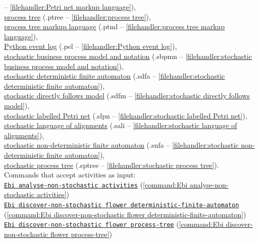 {-- \cref{filehandler:Petri net markup language}), \\\null\qquad\hyperref[filehandler:process tree]{process tree} (.ptree -- \cref{filehandler:process tree}), \\\null\qquad\hyperref[filehandler:process tree markup language]{process tree markup language} (.ptml -- \cref{filehandler:process tree markup language}), \\\null\qquad\hyperref[filehandler:Python event log]{Python event log} (.pel -- \cref{filehandler:Python event log}), \\\null\qquad\hyperref[filehandler:stochastic business process model and notation]{stochastic business process model and notation} (.sbpmn -- \cref{filehandler:stochastic business process model and notation}), \\\null\qquad\hyperref[filehandler:stochastic deterministic finite automaton]{stochastic deterministic finite automaton} (.sdfa -- \cref{filehandler:stochastic deterministic finite automaton}), \\\null\qquad\hyperref[filehandler:stochastic directly follows model]{stochastic directly follows model} (.sdfm -- \cref{filehandler:stochastic directly follows model}), \\\null\qquad\hyperref[filehandler:stochastic labelled Petri net]{stochastic labelled Petri net} (.slpn -- \cref{filehandler:stochastic labelled Petri net}), \\\null\qquad\hyperref[filehandler:stochastic language of alignments]{stochastic language of alignments} (.sali -- \cref{filehandler:stochastic language of alignments}), \\\null\qquad\hyperref[filehandler:stochastic non-deterministic finite automaton]{stochastic non-deterministic finite automaton} (.snfa -- \cref{filehandler:stochastic non-deterministic finite automaton}), \\\null\qquad\hyperref[filehandler:stochastic process tree]{stochastic process tree} (.sptree -- \cref{filehandler:stochastic process tree}).
\\Commands that accept  activities as input: \\\null\qquad\hyperref[command:Ebi analyse-non-stochastic activities]{\texttt{Ebi analyse-non-stochastic activities}} (\cref{command:Ebi analyse-non-stochastic activities})\\\null\qquad\hyperref[command:Ebi discover-non-stochastic flower deterministic-finite-automaton]{\texttt{Ebi discover-non-stochastic flower deterministic-finite-automaton}} (\cref{command:Ebi discover-non-stochastic flower deterministic-finite-automaton})\\\null\qquad\hyperref[command:Ebi discover-non-stochastic flower process-tree]{\texttt{Ebi discover-non-stochastic flower process-tree}} (\cref{command:Ebi discover-non-stochastic flower process-tree})
}
